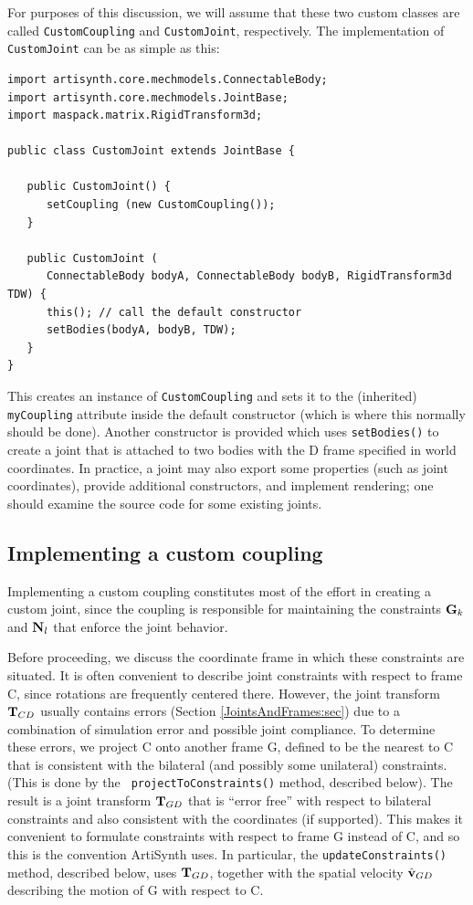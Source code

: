 For purposes of this discussion, we will assume that these two custom
classes are called {\tt CustomCoupling} and {\tt CustomJoint},
respectively. The implementation of {\tt CustomJoint} can be as simple
as this:
%
\begin{lstlisting}[]
import artisynth.core.mechmodels.ConnectableBody;
import artisynth.core.mechmodels.JointBase;
import maspack.matrix.RigidTransform3d;

public class CustomJoint extends JointBase {

   public CustomJoint() {
      setCoupling (new CustomCoupling());
   }

   public CustomJoint (
      ConnectableBody bodyA, ConnectableBody bodyB, RigidTransform3d TDW) {
      this(); // call the default constructor
      setBodies(bodyA, bodyB, TDW);
   }
}
\end{lstlisting}
%
This creates an instance of {\tt CustomCoupling} and sets it to the
(inherited) {\tt myCoupling} attribute inside the default constructor
(which is where this normally should be done). Another constructor is
provided which uses {\tt setBodies()} to create a joint that is
attached to two bodies with the D frame specified in world
coordinates. In practice, a joint may also export some properties
(such as joint coordinates), provide additional constructors, and
implement rendering; one should examine the source code for some
existing joints.

\subsection{Implementing a custom coupling}
\label{CustomCoupling:sec}

Implementing a custom coupling constitutes most of the effort in
creating a custom joint, since the coupling is responsible for
maintaining the constraints ${\bf G}_k$ and ${\bf N}_l$ that enforce the joint
behavior.

Before proceeding, we discuss the coordinate frame in which these
constraints are situated. It is often convenient to describe joint
constraints with respect to frame C, since rotations are frequently
centered there. However, the joint transform ${\bf T}_{CD}$ usually
contains errors (Section \ref{JointsAndFrames:sec}) due to a
combination of simulation error and possible joint compliance. To
determine these errors, we project C onto another frame G, defined to
be the nearest to C that is consistent with the bilateral (and possibly
some unilateral) constraints. (This is done by the {\tt
projectToConstraints()} method, described below).  The result is a
joint transform ${\bf T}_{GD}$ that is ``error free'' with respect to
bilateral constraints and also consistent with the coordinates (if
supported). This makes it convenient to formulate constraints with
respect to frame G instead of C, and so this is the convention
ArtiSynth uses. In particular, the {\tt updateConstraints()} method,
described below, uses ${\bf T}_{GD}$, together with the spatial velocity
$\hat{{\bf v}}_{GD}$ describing the motion of G with respect to C.

